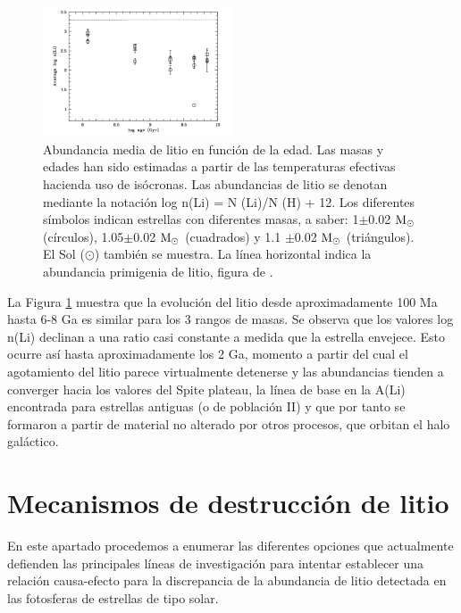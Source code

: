 \begin{figure}
	\centering
	\includegraphics[width=0.5\textwidth]{img/tesis/li_abundances_vs_age.pdf}
	\caption{Abundancia media de litio en función de la edad. Las masas y edades han sido estimadas a partir de las temperaturas efectivas hacienda uso de isócronas. Las abundancias de litio se denotan mediante la notación log n(Li) = N (Li)/N (H) + 12. Los diferentes símbolos indican estrellas con diferentes masas, a saber: 1$\pm$0.02 $\mathrm{M}_\odot$ (círculos), 1.05$\pm$0.02 $\mathrm{M}_\odot$ (cuadrados) y 1.1 $\pm$0.02 $\mathrm{M}_\odot$ (triángulos). El Sol ($\odot$) también se muestra. La línea horizontal indica la abundancia primigenia de litio, figura de \cite{Randich2006}.}
	\label{fig:li_abundances_vs_age}
\end{figure}

La Figura \ref{fig:li_abundances_vs_age} muestra que la evolución del litio desde aproximadamente 100 Ma hasta 6-8 Ga es similar para los 3 rangos de masas. Se observa que los valores log n(Li) declinan a una ratio casi constante a medida que la estrella envejece. Esto ocurre así hasta aproximadamente los 2 Ga, momento a partir del cual el agotamiento del litio parece virtualmente detenerse y las abundancias tienden a converger hacia los valores del Spite plateau, la línea de base en la A(Li) encontrada para estrellas antiguas (o de población II) y que por tanto se formaron a partir de material no alterado por otros procesos, que orbitan el halo galáctico. \par

\section{Mecanismos de destrucción de litio}
En este apartado procedemos a enumerar las diferentes opciones que actualmente defienden las principales líneas de investigación para intentar establecer una relación causa-efecto para la discrepancia de la abundancia de litio detectada en las fotosferas de estrellas de tipo solar.\par

